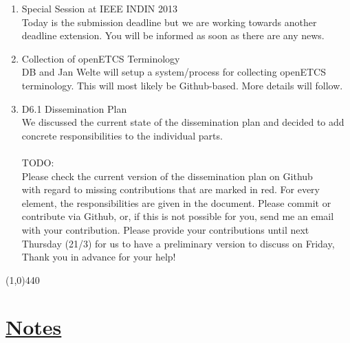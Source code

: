 \documentclass[a4paper]{article}
\begin{document}
\begin{enumerate}

\item Special Session at IEEE INDIN 2013\\
Today is the submission deadline but we are working towards another
deadline extension. You will be informed as soon as there are any news.

\item Collection of openETCS Terminology\\
DB and Jan Welte will setup a system/process for collecting openETCS
terminology. This will most likely be Github-based. More details will
follow.

\item D6.1 Dissemination Plan\\
We discussed the current state of the dissemination plan and decided to add
concrete responsibilities to the individual parts.\\
\\
TODO:\\
Please check the current version of the dissemination plan on Github\\


with regard to missing contributions that are marked in red. For every
element, the responsibilities are given in the document. Please commit or
contribute via Github, or, if this is not possible for you, send me an
email with your contribution. Please provide your contributions until next
Thursday (21/3) for us to have a preliminary version to discuss on Friday,\\
Thank you in advance for your help!\\

\end{enumerate}

\line(1,0){440}
\section*{\underline{Notes}}
\end{document}
